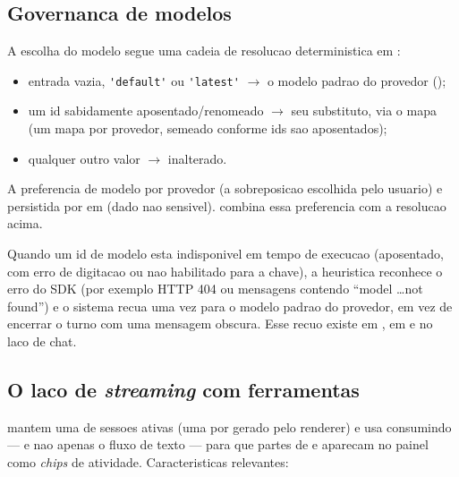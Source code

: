 \subsection{Governanca de modelos}

A escolha do modelo segue uma cadeia de resolucao deterministica em
:

\begin{itemize}[leftmargin=1.4em]
  \item entrada vazia, \lstinline|'default'| ou \lstinline|'latest'| $\rightarrow$ o modelo padrao do provedor ();
  \item um id sabidamente aposentado/renomeado $\rightarrow$ seu substituto, via o mapa  (um mapa por provedor, semeado conforme ids sao aposentados);
  \item qualquer outro valor $\rightarrow$ inalterado.
\end{itemize}

A preferencia de modelo por provedor (a sobreposicao escolhida pelo usuario) e
persistida por  em
 (dado nao sensivel). 
combina essa preferencia com a resolucao acima.

Quando um id de modelo esta indisponivel em tempo de execucao (aposentado, com
erro de digitacao ou nao habilitado para a chave), a heuristica
 reconhece o erro do SDK (por exemplo HTTP 404 ou
mensagens contendo \enquote{model \dots not found}) e o sistema recua uma vez
para o modelo padrao do provedor, em vez de encerrar o turno com uma mensagem
obscura. Esse recuo existe em , em  e
no laco de chat.

\subsection{O laco de \emph{streaming} com ferramentas}

 mantem uma  de sessoes ativas (uma por
 gerado pelo renderer) e usa  consumindo
 --- e nao apenas o fluxo de texto --- para que partes de
 e  aparecam no painel como
\emph{chips} de atividade. Caracteristicas relevantes:

